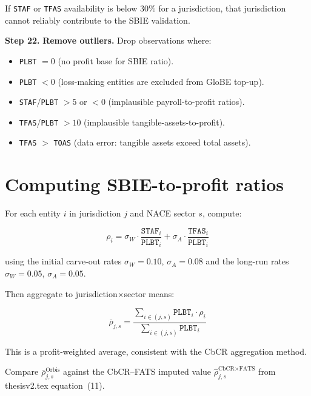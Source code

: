 \documentclass[11pt,a4paper]{article}
\newcommand{\field}[1]{\texttt{#1}}
\newcommand{\step}[1]{\noindent\textbf{Step #1.}\quad}
\begin{document}
If \field{STAF} or \field{TFAS} availability is below 30\% for a jurisdiction, that jurisdiction cannot reliably contribute to the SBIE validation.

\step{22} \textbf{Remove outliers.} Drop observations where:
\begin{itemize}[noitemsep]
  \item \field{PLBT} $= 0$ (no profit base for SBIE ratio).
  \item \field{PLBT} $< 0$ (loss-making entities are excluded from GloBE top-up).
  \item \field{STAF}/\field{PLBT} $> 5$ or $< 0$ (implausible payroll-to-profit ratios).
  \item \field{TFAS}/\field{PLBT} $> 10$ (implausible tangible-assets-to-profit).
  \item \field{TFAS} $>$ \field{TOAS} (data error: tangible assets exceed total assets).
\end{itemize}


\section{Computing SBIE-to-profit ratios}\label{sec:sbie_compute}

For each entity $i$ in jurisdiction $j$ and NACE sector $s$, compute:

\begin{equation}
\rho_{i} = \sigma_W \cdot \frac{\field{STAF}_i}{\field{PLBT}_i} + \sigma_A \cdot \frac{\field{TFAS}_i}{\field{PLBT}_i}
\end{equation}

using the initial carve-out rates $\sigma_W = 0.10$, $\sigma_A = 0.08$ and the long-run rates $\sigma_W = 0.05$, $\sigma_A = 0.05$.

Then aggregate to jurisdiction$\times$sector means:

\begin{equation}
\bar{\rho}_{j,s} = \frac{\sum_{i \in (j,s)} \field{PLBT}_i \cdot \rho_i}{\sum_{i \in (j,s)} \field{PLBT}_i}
\end{equation}

This is a profit-weighted average, consistent with the CbCR aggregation method.

Compare $\bar{\rho}_{j,s}^{\text{Orbis}}$ against the CbCR--FATS imputed value $\hat{\rho}_{j,s}^{\text{CbCR} \times \text{FATS}}$ from thesisv2.tex equation~(11).
\end{document}
